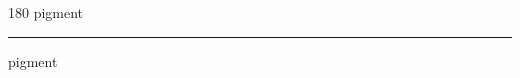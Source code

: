 
\begin{frame}
\begin{center}
\begin{turn}{180}
{\fontsize{2.5cm}{1em}\selectfont pigment}
\end{turn}
\vspace{1em}\par  
\hrule
\vspace{1em}\par  
{\fontsize{2.5cm}{1em}\selectfont pigment}
\end{center}
\end{frame}
